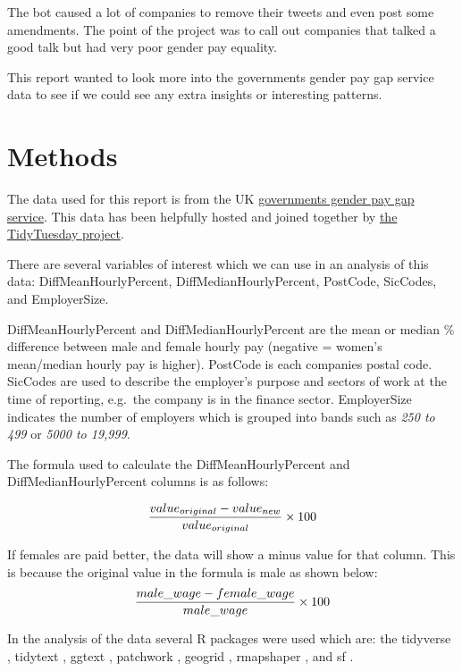 \documentclass[
  11pt,
]{article}
\begin{document}
The bot caused a lot of companies to remove their tweets and even post
some amendments. The point of the project was to call out companies that
talked a good talk but had very poor gender pay equality.

This report wanted to look more into the governments gender pay gap
service data to see if we could see any extra insights or interesting
patterns.

\newpage

\hypertarget{methods}{%
\section{Methods}\label{methods}}

The data used for this report is from the UK
\href{https://gender-pay-gap.service.gov.uk/}{governments gender pay gap
service}. This data has been helpfully hosted and joined together by
\href{https://github.com/rfordatascience/tidytuesday/tree/master/data/2022/2022-06-28}{the
TidyTuesday project}.

There are several variables of interest which we can use in an analysis
of this data: DiffMeanHourlyPercent, DiffMedianHourlyPercent, PostCode,
SicCodes, and EmployerSize.

DiffMeanHourlyPercent and DiffMedianHourlyPercent are the mean or median
\% difference between male and female hourly pay (negative = women's
mean/median hourly pay is higher). PostCode is each companies postal
code. SicCodes are used to describe the employer's purpose and sectors
of work at the time of reporting, e.g.~the company is in the finance
sector. EmployerSize indicates the number of employers which is grouped
into bands such as \emph{250 to 499} or \emph{5000 to 19,999}.

The formula used to calculate the DiffMeanHourlyPercent and
DiffMedianHourlyPercent columns is as follows:

\[ {{value_{original} - value_{new}} \over {value_{original}}} \times 100 \]

If females are paid better, the data will show a minus value for that
column. This is because the original value in the formula is male as
shown below:
\[ {{male\_wage - female\_wage \over male\_wage}} \times 100 \]

In the analysis of the data several R packages were used which are: the
tidyverse \citep{tidyverse}, tidytext \citep{tidytext}, ggtext
\citep{ggtext}, patchwork \citep{patchwork}, geogrid \citep{geogrid},
rmapshaper \citep{rmapshaper}, and sf \citep{sf}.
\end{document}
